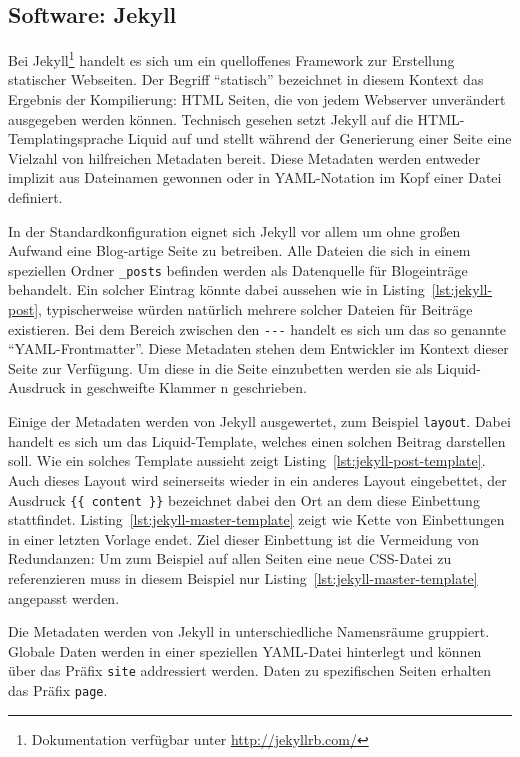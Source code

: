 \subsection{Software: Jekyll}
\label{sec:software-jekyll}
Bei Jekyll\footnote{Dokumentation verfügbar unter \url{http://jekyllrb.com/}} handelt es sich um ein quelloffenes Framework zur Erstellung statischer Webseiten. Der Begriff "`statisch"' bezeichnet in diesem Kontext das Ergebnis der Kompilierung: HTML Seiten, die von jedem Webserver unverändert ausgegeben werden können. Technisch gesehen setzt Jekyll auf die HTML-Templatingsprache Liquid auf und stellt während der Generierung einer Seite eine Vielzahl von hilfreichen Metadaten bereit. Diese Metadaten werden entweder implizit aus Dateinamen gewonnen oder in YAML-Notation im Kopf einer Datei definiert.

In der Standardkonfiguration eignet sich Jekyll vor allem um ohne großen Aufwand eine Blog-artige Seite zu betreiben. Alle Dateien die sich in einem speziellen Ordner \lstinline{_posts} befinden werden als Datenquelle für Blogeinträge behandelt. Ein solcher Eintrag könnte dabei aussehen wie in Listing~\ref{lst:jekyll-post}, typischerweise würden natürlich mehrere solcher Dateien für Beiträge existieren. Bei dem Bereich zwischen den \lstinline{---} handelt es sich um das so genannte "`YAML-Frontmatter"'. Diese Metadaten stehen dem Entwickler im Kontext dieser Seite zur Verfügung. Um diese in die Seite einzubetten werden sie als Liquid-Ausdruck in geschweifte Klammer
n geschrieben.

Einige der Metadaten werden von Jekyll ausgewertet, zum Beispiel \lstinline{layout}. Dabei handelt es sich um das Liquid-Template, welches einen solchen Beitrag darstellen soll. Wie ein solches Template aussieht zeigt Listing~\ref{lst:jekyll-post-template}. Auch dieses Layout wird seinerseits wieder in ein anderes Layout eingebettet, der Ausdruck \lstinline|{{ content }}| bezeichnet dabei den Ort an dem diese Einbettung stattfindet. Listing~\ref{lst:jekyll-master-template} zeigt wie Kette von Einbettungen in einer letzten Vorlage endet. Ziel dieser Einbettung ist die Vermeidung von Redundanzen: Um zum Beispiel auf allen Seiten eine neue CSS-Datei zu referenzieren muss in diesem Beispiel nur Listing~\ref{lst:jekyll-master-template} angepasst werden.

Die Metadaten werden von Jekyll in unterschiedliche Namensräume gruppiert. Globale Daten werden in einer speziellen YAML-Datei hinterlegt und können über das Präfix \lstinline{site} addressiert werden. Daten zu spezifischen Seiten erhalten das Präfix \lstinline{page}.

